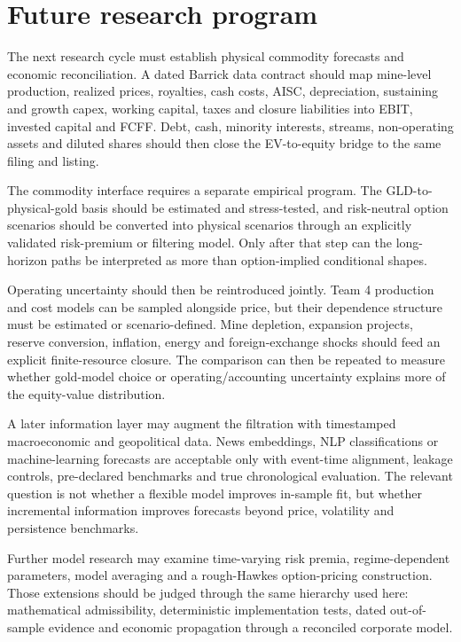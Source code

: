\section*{Future research program}

The next research cycle must establish physical commodity forecasts and economic reconciliation. A dated Barrick data contract should
map mine-level production, realized prices, royalties, cash costs, AISC,
depreciation, sustaining and growth capex, working capital, taxes and closure
liabilities into EBIT, invested capital and FCFF. Debt, cash, minority
interests, streams, non-operating assets and diluted shares should then close
the EV-to-equity bridge to the same filing and listing.

The commodity interface requires a separate empirical program. The GLD-to-physical-gold
basis should be estimated and stress-tested, and risk-neutral
option scenarios should be converted into physical scenarios through an
explicitly validated risk-premium or filtering model. Only after that step can
the long-horizon paths be interpreted as more than option-implied conditional
shapes.

Operating uncertainty should then be reintroduced jointly. Team 4 production
and cost models can be sampled alongside price, but their dependence structure
must be estimated or scenario-defined. Mine depletion, expansion projects,
reserve conversion, inflation, energy and foreign-exchange shocks should feed
an explicit finite-resource closure. The comparison can then be repeated to
measure whether gold-model choice or operating/accounting uncertainty explains
more of the equity-value distribution.

A later information layer may augment the filtration with timestamped
macroeconomic and geopolitical data. News embeddings, NLP classifications or
machine-learning forecasts are acceptable only with event-time alignment,
leakage controls, pre-declared benchmarks and true chronological evaluation.
The relevant question is not whether a flexible model improves in-sample fit,
but whether incremental information improves forecasts beyond price,
volatility and persistence benchmarks.

Further model research may examine time-varying risk premia, regime-dependent
parameters, model averaging and a rough-Hawkes option-pricing construction.
Those extensions should be judged through the same hierarchy used here:
mathematical admissibility, deterministic implementation tests, dated
out-of-sample evidence and economic propagation through a reconciled corporate
model.

